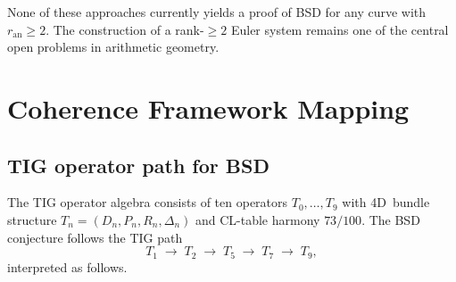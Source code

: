 \documentclass[11pt]{article}
\begin{document}
\noindent
None of these approaches currently yields a proof of BSD for any curve with
$r_{\mathrm{an}} \geq 2$.  The construction of a rank-$\geq 2$ Euler system
remains one of the central open problems in arithmetic geometry.

\section{Coherence Framework Mapping}
\label{sec:coherence}

\subsection{TIG operator path for BSD}

The TIG operator algebra consists of ten operators $T_0, \ldots, T_9$ with
4D~bundle structure $T_n = (D_n, P_n, R_n, \Delta_n)$ and CL-table harmony
$73/100$.  The BSD conjecture follows the TIG path
\[
  T_1 \;\longrightarrow\; T_2 \;\longrightarrow\; T_5
  \;\longrightarrow\; T_7 \;\longrightarrow\; T_9,
\]
interpreted as follows.
\end{document}
